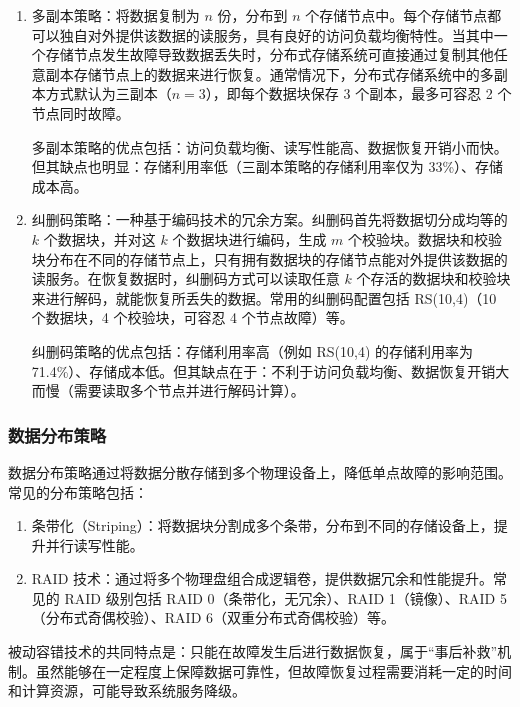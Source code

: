 \begin{enumerate}
    \item 多副本策略：将数据复制为 $n$ 份，分布到 $n$ 个存储节点中。每个存储节点都可以独自对外提供该数据的读服务，具有良好的访问负载均衡特性。当其中一个存储节点发生故障导致数据丢失时，分布式存储系统可直接通过复制其他任意副本存储节点上的数据来进行恢复。通常情况下，分布式存储系统中的多副本方式默认为三副本（$n=3$），即每个数据块保存 3 个副本，最多可容忍 2 个节点同时故障。
    
    多副本策略的优点包括：访问负载均衡、读写性能高、数据恢复开销小而快。但其缺点也明显：存储利用率低（三副本策略的存储利用率仅为 33\%）、存储成本高。
    
    \item 纠删码策略：一种基于编码技术的冗余方案。纠删码首先将数据切分成均等的 $k$ 个数据块，并对这 $k$ 个数据块进行编码，生成 $m$ 个校验块。数据块和校验块分布在不同的存储节点上，只有拥有数据块的存储节点能对外提供该数据的读服务。在恢复数据时，纠删码方式可以读取任意 $k$ 个存活的数据块和校验块来进行解码，就能恢复所丢失的数据。常用的纠删码配置包括 RS(10,4)（10 个数据块，4 个校验块，可容忍 4 个节点故障）等。
    
    纠删码策略的优点包括：存储利用率高（例如 RS(10,4) 的存储利用率为 71.4\%）、存储成本低。但其缺点在于：不利于访问负载均衡、数据恢复开销大而慢（需要读取多个节点并进行解码计算）。
\end{enumerate}

\subsubsection{数据分布策略}

数据分布策略通过将数据分散存储到多个物理设备上，降低单点故障的影响范围。常见的分布策略包括：

\begin{enumerate}
    \item 条带化（Striping）：将数据块分割成多个条带，分布到不同的存储设备上，提升并行读写性能。
    
    \item RAID 技术：通过将多个物理盘组合成逻辑卷，提供数据冗余和性能提升。常见的 RAID 级别包括 RAID 0（条带化，无冗余）、RAID 1（镜像）、RAID 5（分布式奇偶校验）、RAID 6（双重分布式奇偶校验）等。
\end{enumerate}

被动容错技术的共同特点是：只能在故障发生后进行数据恢复，属于“事后补救”机制。虽然能够在一定程度上保障数据可靠性，但故障恢复过程需要消耗一定的时间和计算资源，可能导致系统服务降级。

